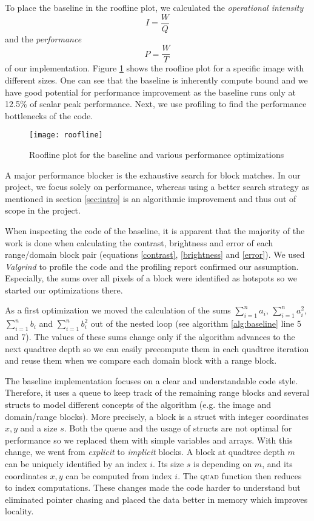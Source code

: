 To place the baseline in the roofline plot, we calculated the \textit{operational intensity}
$$
I=\frac{W}{Q}
$$
and the \textit{performance}
$$P=\frac{W}{T}$$
of our implementation. Figure \ref{fig:roofline} shows the 
roofline plot for a specific image with different sizes. One can see that the baseline is inherently compute bound and we have good potential for
performance improvement as the baseline runs only at 12.5\% of scalar peak performance. Next, we use 
profiling to find the performance bottlenecks of the code.

\begin{figure}
  \texttt{[image: roofline]}
  \caption{Roofline plot for the baseline and various performance optimizations}
  \label{fig:roofline}
\end{figure}

 A major performance blocker is the exhaustive search for block matches.
In our project, we focus solely on performance, 
whereas using a better search strategy as mentioned in section \ref{sec:intro} is an algorithmic improvement
and thus out of scope in the project.

When inspecting the code of the baseline, it is apparent that the majority of the work
is done when calculating the contrast, brightness and error of each range/domain block pair 
(equations \ref{contrast}, \ref{brightness} and \ref{error}). We used \textit{Valgrind} 
\cite{valgrind} to profile the code and the profiling report confirmed our assumption. Especially, the sums
over all pixels of a block were identified as hotspots so we started our optimizations there.

 As a first optimization we moved the calculation of the sums $\sum_{i=1}^n a_i$, 
$\sum_{i=1}^n a_i^2$, $\sum_{i=1}^n b_i$ and $\sum_{i=1}^n b_i^2$ out of the nested loop 
(see algorithm \ref{alg:baseline} line 5 and 7). The values of these sums change only if the algorithm advances
to the next quadtree depth so we can easily precompute them in each quadtree iteration and reuse them when we
compare each domain block with a range block.

The baseline implementation focuses on a clear and understandable code style. Therefore, it uses a queue 
to keep track of the remaining range blocks and several structs to model different concepts of the algorithm 
(e.g. the image and domain/range blocks). More precisely, a block is a struct with integer coordinates $x,y$ and a size $s$. 
Both the queue and the usage of structs are not optimal for performance so we replaced them 
with simple variables and arrays. With this change, we went from \textit{explicit} to \textit{implicit} blocks. 
A block at quadtree depth $m$ can be uniquely identified by an index $i$. Its size $s$ is depending on $m$, 
and its coordinates $x,y$ can be computed from index $i$. The \textsc{quad} function then reduces to index computations. 
These changes made the code harder to understand but eliminated pointer chasing and placed the 
data better in memory which improves locality.


